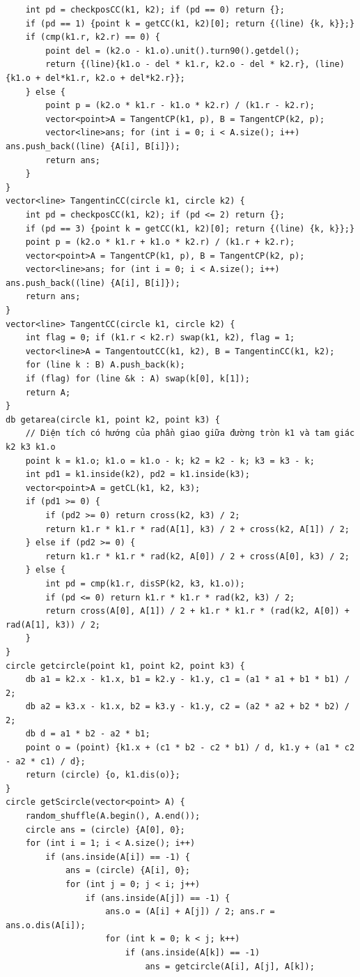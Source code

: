 \documentclass[11pt]{article}
\begin{document}
\begin{verbatim}
	int pd = checkposCC(k1, k2); if (pd == 0) return {};
	if (pd == 1) {point k = getCC(k1, k2)[0]; return {(line) {k, k}};}
	if (cmp(k1.r, k2.r) == 0) {
		point del = (k2.o - k1.o).unit().turn90().getdel();
		return {(line){k1.o - del * k1.r, k2.o - del * k2.r}, (line) {k1.o + del*k1.r, k2.o + del*k2.r}};
	} else {
		point p = (k2.o * k1.r - k1.o * k2.r) / (k1.r - k2.r);
		vector<point>A = TangentCP(k1, p), B = TangentCP(k2, p);
		vector<line>ans; for (int i = 0; i < A.size(); i++) ans.push_back((line) {A[i], B[i]});
		return ans;
	}
}
vector<line> TangentinCC(circle k1, circle k2) {
	int pd = checkposCC(k1, k2); if (pd <= 2) return {};
	if (pd == 3) {point k = getCC(k1, k2)[0]; return {(line) {k, k}};}
	point p = (k2.o * k1.r + k1.o * k2.r) / (k1.r + k2.r);
	vector<point>A = TangentCP(k1, p), B = TangentCP(k2, p);
	vector<line>ans; for (int i = 0; i < A.size(); i++) ans.push_back((line) {A[i], B[i]});
	return ans;
}
vector<line> TangentCC(circle k1, circle k2) {
	int flag = 0; if (k1.r < k2.r) swap(k1, k2), flag = 1;
	vector<line>A = TangentoutCC(k1, k2), B = TangentinCC(k1, k2);
	for (line k : B) A.push_back(k);
	if (flag) for (line &k : A) swap(k[0], k[1]);
	return A;
}
db getarea(circle k1, point k2, point k3) {
	// Diện tích có hướng của phần giao giữa đường tròn k1 và tam giác k2 k3 k1.o
	point k = k1.o; k1.o = k1.o - k; k2 = k2 - k; k3 = k3 - k;
	int pd1 = k1.inside(k2), pd2 = k1.inside(k3);
	vector<point>A = getCL(k1, k2, k3);
	if (pd1 >= 0) {
		if (pd2 >= 0) return cross(k2, k3) / 2;
		return k1.r * k1.r * rad(A[1], k3) / 2 + cross(k2, A[1]) / 2;
	} else if (pd2 >= 0) {
		return k1.r * k1.r * rad(k2, A[0]) / 2 + cross(A[0], k3) / 2;
	} else {
		int pd = cmp(k1.r, disSP(k2, k3, k1.o));
		if (pd <= 0) return k1.r * k1.r * rad(k2, k3) / 2;
		return cross(A[0], A[1]) / 2 + k1.r * k1.r * (rad(k2, A[0]) + rad(A[1], k3)) / 2;
	}
}
circle getcircle(point k1, point k2, point k3) {
	db a1 = k2.x - k1.x, b1 = k2.y - k1.y, c1 = (a1 * a1 + b1 * b1) / 2;
	db a2 = k3.x - k1.x, b2 = k3.y - k1.y, c2 = (a2 * a2 + b2 * b2) / 2;
	db d = a1 * b2 - a2 * b1;
	point o = (point) {k1.x + (c1 * b2 - c2 * b1) / d, k1.y + (a1 * c2 - a2 * c1) / d};
	return (circle) {o, k1.dis(o)};
}
circle getScircle(vector<point> A) {
	random_shuffle(A.begin(), A.end());
	circle ans = (circle) {A[0], 0};
	for (int i = 1; i < A.size(); i++)
		if (ans.inside(A[i]) == -1) {
			ans = (circle) {A[i], 0};
			for (int j = 0; j < i; j++)
				if (ans.inside(A[j]) == -1) {
					ans.o = (A[i] + A[j]) / 2; ans.r = ans.o.dis(A[i]);
					for (int k = 0; k < j; k++)
						if (ans.inside(A[k]) == -1)
							ans = getcircle(A[i], A[j], A[k]);

\end{verbatim}
\end{document}

